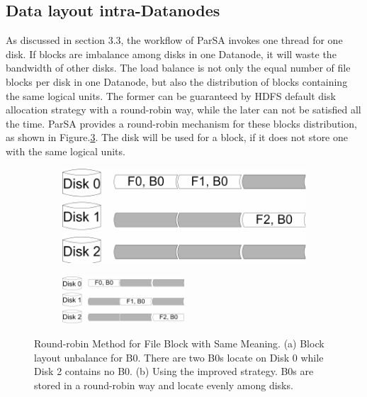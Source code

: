 \documentclass[preprint,12pt]{elsarticle}
\begin{document}
\subsection{Data layout intra-Datanodes}
As discussed in section 3.3, the workflow of ParSA invokes one thread for one disk. If blocks are imbalance among disks in one Datanode, 
it will waste the bandwidth of other disks. The load balance is not only the equal number of file blocks per disk in one Datanode, but 
also the distribution of blocks containing the same logical units. The former can be guaranteed by HDFS default disk allocation strategy
with a round-robin way, while the later can not be satisfied all the time. ParSA provides a round-robin mechanism for these blocks 
distribution, as shown in Figure.\ref{figure7}. The disk will be used for a block, if it does not store one with the same logical 
units. \par

\begin{figure}[htb]
    \centering
    \begin{subfigure}{0.5\textwidth}
        \includegraphics[width=\textwidth]{figure7a}
        \caption{}
        \label{figure7a}
    \end{subfigure}

    \begin{subfigure}{\textwidth}
        \centering
        \includegraphics[width=0.5\textwidth]{figure7b}%
        \caption{}
        \label{figure7b}
    \end{subfigure}
    \caption{Round-robin Method for File Block with Same Meaning. (a) Block layout unbalance for B0. There are two B0s locate on Disk 0
             while Disk 2 contains no B0. (b) Using the improved strategy. B0s are stored in a round-robin way and locate evenly among 
             disks.}
    \label{figure7}
\end{figure}
\end{document}
